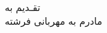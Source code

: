 \clearpage
\thispagestyle{empty}

{\BZarScaleOne
{\fontsize{28pt}{0}\selectfont
\noindent
تقـدیم به
\\[1cm]
\hspace*{1cm}
مادرم به مهربانی فرشته
}}
		
\restoregeometry